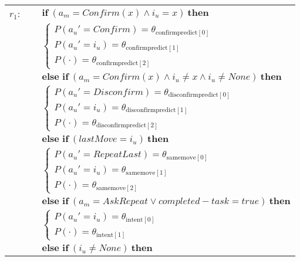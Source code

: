 \begin{footnotesize}
\begin{longtable}{p{2cm}l}
$r_{1}$: \ \ & $ \textbf{if} \ (\mathit{a_m}\!=\!\mathit{Confirm({x})} \land \mathit{i_u}\!=\!\mathit{{x}}) \ \textbf{then} $ \\
 & \;\;\;\;\; $ \begin{cases}P(\mathit{a_u}'\!=\!\mathit{Confirm})\!=\!\theta_{\mathrm{confirmpredict[0]}} \\
P(\mathit{a_u}'\!=\!\mathit{{i_u}})\!=\!\theta_{\mathrm{confirmpredict[1]}} \\
P(\cdot)\!=\!\theta_{\mathrm{confirmpredict[2]}} \end{cases}$  \vspace{1mm} \\ & $ \textbf{else if} \ (\mathit{a_m}\!=\!\mathit{Confirm({x})} \land \mathit{i_u}\!\neq\!\mathit{{x}} \land \mathit{i_u}\!\neq\!\mathit{None}) \ \textbf{then}$ \\
& \;\;\;\;\; $ \begin{cases}P(\mathit{a_u}'\!=\!\mathit{Disconfirm})\!=\!\theta_{\mathrm{disconfirmpredict[0]}} \\
P(\mathit{a_u}'\!=\!\mathit{{i_u}})\!=\!\theta_{\mathrm{disconfirmpredict[1]}} \\
P(\cdot)\!=\!\theta_{\mathrm{disconfirmpredict[2]}} \end{cases}$ \vspace{1mm} \\ & $ \textbf{else if} \ (\mathit{lastMove}\!=\!\mathit{{i_u}}) \ \textbf{then}$ \\
& \;\;\;\;\; $ \begin{cases}P(\mathit{a_u}'\!=\!\mathit{RepeatLast})\!=\!\theta_{\mathrm{samemove[0]}} \\
P(\mathit{a_u}'\!=\!\mathit{{i_u}})\!=\!\theta_{\mathrm{samemove[1]}} \\
P(\cdot)\!=\!\theta_{\mathrm{samemove[2]}} \end{cases}$ \vspace{1mm} \\ & $ \textbf{else if} \ (\mathit{a_m}\!=\!\mathit{AskRepeat} \lor \mathit{completed-task}\!=\!\mathit{true}) \ \textbf{then}$ \\
& \;\;\;\;\; $ \begin{cases}P(\mathit{a_u}'\!=\!\mathit{{i_u}})\!=\!\theta_{\mathrm{intent[0]}} \\
P(\cdot)\!=\!\theta_{\mathrm{intent[1]}} \end{cases}$  \vspace{1mm} \\ & $ \textbf{else if} \ (\mathit{i_u}\!\neq\!\mathit{None}) \ \textbf{then}$ \\

\end{longtable}
\end{footnotesize}
